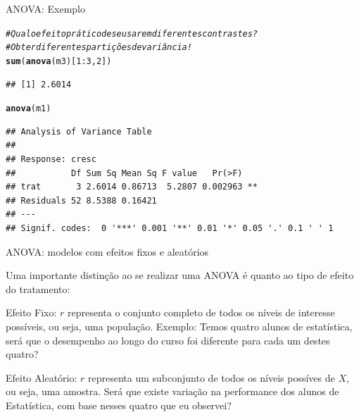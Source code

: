 \documentclass{beamer}\usepackage[]{graphicx}\usepackage[]{color}
\makeatletter
\newcommand{\hlnum}[1]{\textcolor[rgb]{0.686,0.059,0.569}{#1}}%
\newcommand{\hlcom}[1]{\textcolor[rgb]{0.678,0.584,0.686}{\textit{#1}}}%
\newcommand{\hlopt}[1]{\textcolor[rgb]{0,0,0}{#1}}%
\newcommand{\hlstd}[1]{\textcolor[rgb]{0.345,0.345,0.345}{#1}}%
\newcommand{\hlkwd}[1]{\textcolor[rgb]{0.737,0.353,0.396}{\textbf{#1}}}%
\newenvironment{kframe}{%
 \def\at@end@of@kframe{}%
 \ifinner\ifhmode%
  \def\at@end@of@kframe{\end{minipage}}%
  \begin{minipage}{\columnwidth}%
 \fi\fi%
 \def\FrameCommand##1{\hskip\@totalleftmargin \hskip-\fboxsep
 \colorbox{shadecolor}{##1}\hskip-\fboxsep
     \hskip-\linewidth \hskip-\@totalleftmargin \hskip\columnwidth}%
 \MakeFramed {\advance\hsize-\width
   \@totalleftmargin\z@ \linewidth\hsize
   \@setminipage}}%
 {\par\unskip\endMakeFramed%
 \at@end@of@kframe}
\newenvironment{knitrout}{}{} %
\renewenvironment{knitrout}{\setlength{\topsep}{0mm}}{}
\makeatother
\begin{document}
\begin{frame}[fragile]{ANOVA: Exemplo}

\begin{knitrout}\tiny
{}\color{fgcolor}\begin{kframe}
\begin{alltt}
\hlcom{# Qual o efeito prático de se usarem diferentes contrastes?}
\hlcom{# Obter diferentes partições de variância!}
\hlkwd{sum}\hlstd{(}\hlkwd{anova}\hlstd{(m3)[}\hlnum{1}\hlopt{:}\hlnum{3}\hlstd{,}\hlnum{2}\hlstd{])}
\end{alltt}
\begin{verbatim}
## [1] 2.6014
\end{verbatim}
\begin{alltt}
\hlkwd{anova}\hlstd{(m1)}
\end{alltt}
\begin{verbatim}
## Analysis of Variance Table
## 
## Response: cresc
##           Df Sum Sq Mean Sq F value   Pr(>F)   
## trat       3 2.6014 0.86713  5.2807 0.002963 **
## Residuals 52 8.5388 0.16421                    
## ---
## Signif. codes:  0 '***' 0.001 '**' 0.01 '*' 0.05 '.' 0.1 ' ' 1
\end{verbatim}
\end{kframe}
\end{knitrout}

\end{frame}

\begin{frame}{ANOVA: modelos com efeitos fixos e aleatórios}

Uma importante distinção ao se realizar uma ANOVA é quanto ao tipo de efeito do tratamento:
\vfill

\begin{block}{Efeito Fixo:}
$r$ representa o conjunto completo de todos os níveis de interesse possíveis, ou seja, uma população. Exemplo: Temos quatro alunos de estatística, será que o desempenho ao longo do curso foi diferente para cada um destes quatro?
\end{block}
\vfill

\pause

\begin{block}{Efeito Aleatório:}
$r$ representa um subconjunto de todos os níveis possíves de $X$, ou seja, uma amostra. Será que existe variação na performance dos alunos de Estatística, com base nesses quatro que eu observei? 
\end{block}
\vfill

\end{frame}
\end{document}
